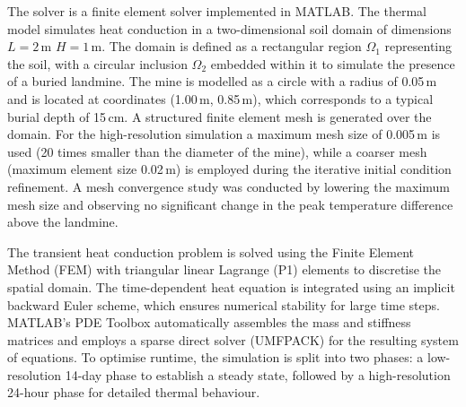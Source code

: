         The solver is a finite element solver implemented in MATLAB. The thermal model simulates heat conduction in a two-dimensional soil domain of dimensions $L =2$\,m $H = 1$\,m. The domain is defined as a rectangular region $\Omega_1$ representing the soil, with a circular inclusion $\Omega_2$ embedded within it to simulate the presence of a buried landmine. The mine is modelled as a circle with a radius of 0.05\,m and is located at coordinates (1.00\,m, 0.85\,m), which corresponds to a typical burial depth of 15\,cm. A structured finite element mesh is generated over the domain. For the high-resolution simulation a maximum mesh size of 0.005\,m is used (20 times smaller than the diameter of the mine), while a coarser mesh (maximum element size 0.02\,m) is employed during the iterative initial condition refinement. A mesh convergence study was conducted by lowering the maximum mesh size and observing no significant change in the peak temperature difference above the landmine.
        
        The transient heat conduction problem is solved using the Finite Element Method (FEM) with triangular linear Lagrange (P1) elements to discretise the spatial domain. The time-dependent heat equation is integrated using an implicit backward Euler scheme, which ensures numerical stability for large time steps. MATLAB's PDE Toolbox automatically assembles the mass and stiffness matrices and employs a sparse direct solver (UMFPACK) for the resulting system of equations. To optimise runtime, the simulation is split into two phases: a low-resolution 14-day phase to establish a steady state, followed by a high-resolution 24-hour phase for detailed thermal behaviour.
    
